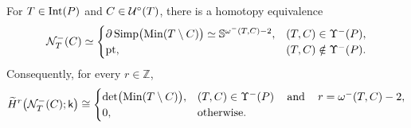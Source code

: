 \begin{proposition}
\label{prop:boundary-complex-topology}
For $T\in \operatorname{Int}(P)$ and $C\in \mathcal U^\circ(T)$, there is a homotopy equivalence
\begin{equation}
\label{eq:boundary-complex-topology}
\mathcal N_T^-(C)\simeq
\begin{cases}
\partial\operatorname{Simp}\bigl(\operatorname{Min}(T\setminus C)\bigr)
\simeq
\mathbb S^{\omega^-(T,C)-2},
&
(T,C)\in\Upsilon^-(P),
\\
\mathrm{pt},
&
(T,C)\notin\Upsilon^-(P).
\end{cases}
\end{equation}
Consequently, for every $r\in\mathbb Z$,
\begin{equation}
\label{eq:boundary-complex-cohomology}
\widetilde H^r\bigl(\mathcal N_T^-(C);\mathsf{k}\bigr)
\cong
\begin{cases}
\det\bigl(\operatorname{Min}(T\setminus C)\bigr),
&
(T,C)\in\Upsilon^-(P)
\operatorname{\quad \text{and} \quad}\nolimits
r=\omega^-(T,C)-2,
\\
0,
&
\text{otherwise}.
\end{cases}
\end{equation}
\end{proposition}

